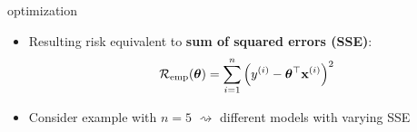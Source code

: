 \documentclass[11pt,compress,t,notes=noshow, xcolor=table]{beamer}
\begin{document}
\begin{frame}{optimization}

\begin{itemize}
    \item Resulting risk equivalent to 
    \textbf{sum of squared errors (SSE)}:
    $$\mathcal{R}_{\text{emp}}(\bm{\theta}) = \sum\limits_{i=1}^n \left(y^{(i)} - \bm{\theta}^\top \mathbf{x}^{(i)} \right)^2$$
    \item Consider example with $n = 5$ $\rightsquigarrow$ 
    different models with varying SSE
\end{itemize}

\vfill
{}
\end{frame}
\end{document}
